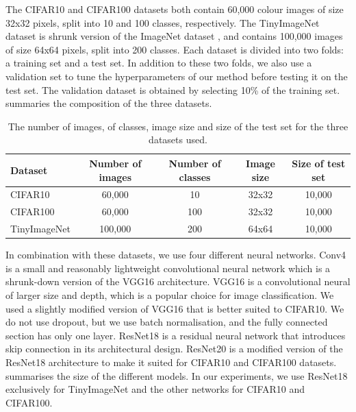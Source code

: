 The CIFAR10 and CIFAR100 datasets both contain 60,000 colour images of size
32x32 pixels, split into 10 and 100 classes, respectively. The TinyImageNet
dataset is shrunk version of the ImageNet dataset
\cite{DBLP:journals/ijcv/RussakovskyDSKS15}, and contains 100,000 images of size
64x64 pixels, split into 200 classes. Each dataset is divided into two folds: a
training set and a test set. In addition to these two folds, we also use a
validation set to tune the hyperparameters of our method before testing it on
the test set. The validation dataset is obtained by selecting 10\% of the
training set.  summaries the composition of the three
datasets.\\


\begin{table}[ht]
  \centering
  \begin{tabular}{lcccc}
    \toprule
    \textbf{Dataset} & \textbf{Number of images} & \textbf{Number of classes} &
    \textbf{Image size} & \textbf{Size of test set} \\ 
    \hline
    CIFAR10 & 60,000 & 10 & 32x32 & 10,000 \\ 
    CIFAR100 & 60,000 & 100 & 32x32 & 10,000\\ 
    TinyImageNet & 100,000 & 200 & 64x64 &10,000 \\ 
    \bottomrule
  \end{tabular}
  \caption{The number of images, of classes, image size and size of the test set for the three datasets used.}
  \label{tab:chap1:datasets}
\end{table}

In combination with these datasets, we use four different neural networks. Conv4
is a small and reasonably lightweight convolutional neural network which is a
shrunk-down version of the VGG16 architecture. VGG16 is a convolutional neural
of larger size and depth, which is a popular choice for image classification. We
used a slightly modified version of VGG16 that is better suited to CIFAR10. We
do not use dropout, but we use batch normalisation, and the fully connected
section has only one layer. ResNet18 is a residual neural network that
introduces skip connection in its architectural design. ResNet20 is a modified
version of the ResNet18 architecture to make it suited for CIFAR10 and CIFAR100
datasets.  summarises the size of the different
models. In our experiments, we use ResNet18 exclusively for TinyImageNet and the
other networks for CIFAR10 and CIFAR100.\\


